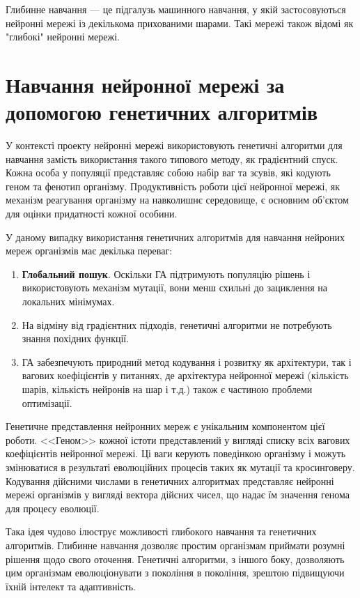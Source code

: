 Глибинне навчання --- це підгалузь машинного навчання, 
у якій застосовуються нейронні мережі із 
декількома прихованими шарами.
Такі мережі також відомі як "глибокі" нейронні мережі. 



\section{Навчання нейронної мережі за допомогою генетичних алгоритмів}

У контексті проекту нейронні мережі використовують
генетичні алгоритми для навчання замість використання
такого типового методу, як градієнтний спуск.
Кожна особа у популяції представляє собою набір ваг та зсувів,
які кодують геном та фенотип організму.
Продуктивність роботи цієї нейронної мережі, як механізм
реагування організму на навколишнє середовище,
є основним об'єктом для оцінки придатності кожної особини.

У даному випадку використання генетичних алгоритмів для
навчання нейроних мереж організмів має декілька переваг:
\begin{enumerate}
  \item \textbf{Глобальний пошук}. Оскільки ГА підтримують популяцію рішень
    і використовують механізм мутації,
    вони менш схильні до зациклення на локальних мінімумах.
  \item На відміну від градієнтних підходів, 
    генетичні алгоритми не потребують знання похідних функції.
  \item ГА забезпечують природний метод 
    кодування і розвитку як архітектури, 
    так і вагових коефіцієнтів у питаннях, 
    де архітектура нейронної мережі 
    (кількість шарів, кількість нейронів на шар і т.д.) 
    також є частиною проблеми оптимізації.
\end{enumerate}

Генетичне представлення нейронних мереж є 
унікальним компонентом цієї роботи. 
<<Геном>> кожної істоти представлений у вигляді списку 
всіх вагових коефіцієнтів нейронної мережі. 
Ці ваги керують поведінкою організму і можуть змінюватися 
в результаті еволюційних процесів
таких як мутації та кросинговеру. 
Кодування дійсними числами в генетичних алгоритмах 
представляє нейронні мережі організмів у вигляді вектора дійсних чисел,
що надає їм значення генома для процесу еволюції.


Така ідея чудово ілюструє можливості 
глибокого навчання та генетичних алгоритмів. 
Глибинне навчання дозволяє простим організмам приймати 
розумні рішення щодо свого оточення. 
Генетичні алгоритми, з іншого боку, 
дозволяють цим організмам еволюціонувати з покоління в покоління, 
зрештою підвищуючи їхній інтелект та адаптивність. 



